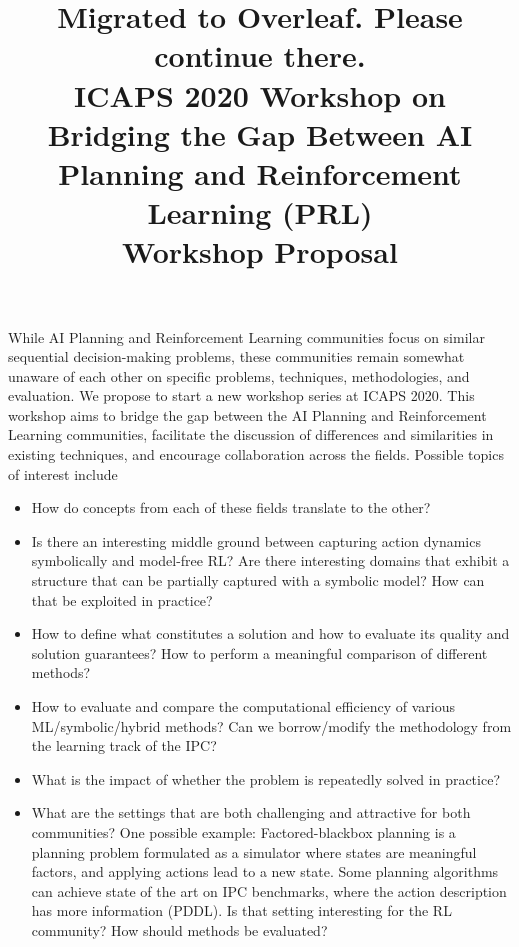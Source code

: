 \documentclass[10pt]{article}
\begin{document}
\title{Migrated to Overleaf. Please continue there.\\ \vspace*{0.7cm}ICAPS 2020 Workshop on \\ Bridging the Gap Between AI Planning and Reinforcement Learning (PRL)\\ \vspace*{0.7cm} Workshop Proposal
}
\date{}

\author{}

\maketitle

While AI Planning and Reinforcement Learning communities focus on similar
sequential decision-making problems, these communities remain somewhat unaware
of each other on specific problems, techniques, methodologies, and evaluation.
%
We propose to start a new workshop series at ICAPS 2020. This workshop aims to
bridge the gap between the AI Planning and Reinforcement Learning communities,
facilitate the discussion of differences and similarities in existing techniques,
and encourage collaboration across the fields. 
%
Possible topics of interest include
\begin{itemize}
\item How do concepts from each of these fields translate to the other?
%
\item Is there an interesting middle ground between capturing action dynamics
symbolically and model-free RL? Are there interesting domains that exhibit a
structure that can be partially captured with a symbolic model? How can that be
exploited in practice?
%
\item How to define what constitutes a solution and how to evaluate its quality
and solution guarantees? How to perform a meaningful comparison of different
methods?
%
\item How to evaluate and compare the computational efficiency of various
ML/symbolic/hybrid methods? Can we borrow/modify the methodology from the
learning track of the IPC?
%
\item What is the impact of whether the problem is repeatedly solved in
practice?
%
\item What are the settings that are both challenging and attractive for both
communities? 
%
One possible example: Factored-blackbox planning is a planning problem
formulated as a simulator where states are meaningful factors, and applying
actions lead to a new state. Some planning algorithms can achieve state of the
art on IPC benchmarks, where the action description has more information (PDDL).
Is that setting interesting for the RL community? How should methods be
evaluated?
\end{itemize}
\end{document}
